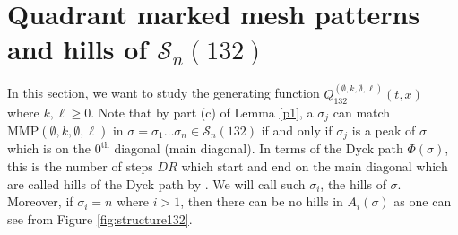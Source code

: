 \documentclass[
final,nomarks
]{dmtcs-episciences}
\newcommand{\fref}[1]{Figure \ref{fig:#1}}
\newcommand{\Sn}[1]{\mathcal{S}_{#1}}
\newcommand{\Qmm}[1]{Q_{132}^{(#1)}(t,x)}
\newcommand{\MMP}{\mathrm{MMP}}
\begin{document}
\section{Quadrant marked mesh patterns and hills of \(\Sn{n}(132)\)}

In this section, we want to study the generating function \begin{math}\Qmm{\emptyset,k,\emptyset,\ell}\end{math} 
where \begin{math}k, \ell \geq 0\end{math}. Note that by part (c) of Lemma \ref{p1}, a \begin{math}\sigma_j\end{math} can match 
\begin{math}\MMP(\emptyset,k,\emptyset,\ell)\end{math} in \begin{math}\sigma = \sigma_1 \ldots \sigma_n \in \Sn{n}(132)\end{math} 
if and only if \begin{math}\sigma_j\end{math} is a peak of \begin{math}\sigma\end{math} which is on the \begin{math}0^{\mathrm{th}}\end{math} diagonal (main diagonal). In terms of the Dyck path 
\begin{math}\Phi(\sigma)\end{math},  this is the number of steps \begin{math}DR\end{math} which start and end on the main diagonal 
which are called hills of the Dyck path by \cite{D,DS}. We will 
call such \begin{math}\sigma_i\end{math}, the hills of \begin{math}\sigma\end{math}.
Moreover, if \begin{math}\sigma_i =n\end{math} where 
\begin{math}i > 1\end{math}, then there can be no hills in \begin{math}A_i(\sigma)\end{math} as one can see from  
\fref{structure132}. 
\end{document}
